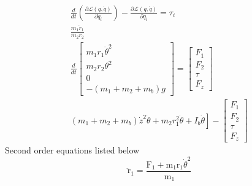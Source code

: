 \documentclass{UoNMCHA}
\numberwithin{equation}{section}
\begin{document}
$$
\begin{array}{c}
\frac{d}{d t}\left(\frac{\partial \mathcal{L}(q, \dot{q})}{\partial \dot{q}_{i}}\right)-\frac{\partial \mathcal{L}(q, \dot{q})}{\partial q_{i}}=\tau_{i} \\
\frac{m_{1} \dot{r}_{1}}{m_{2} \dot{r}_{2}} \\
\frac{d}{d t}\left[\begin{array}{c}
m_{1} r_{1} \dot{\theta}^{2} \\
m_{2} r_{2} \theta^{2} \\
0 \\
-\left(m_{1}+m_{2}+m_{b}\right) g
\end{array}\right]=\left[\begin{array}{c}
F_{1} \\
F_{2} \\
\tau \\
F_{z}
\end{array}\right] \\
\left.\left(m_{1}+m_{2}+m_{b}\right) \dot{z}^{2} \dot{\theta}+m_{2} r_{1}^{2} \dot{\theta}+I_{b} \dot{\theta}\right]-\left[\begin{array}{c}
F_{1} \\
F_{2} \\
\tau \\
F_{z}
\end{array}\right]
\end{array}
$$
Second order equations listed below
$$
\ddot{\mathrm{r}}_{1}=\frac{\mathrm{F}_{1}+\mathrm{m}_{1} \mathrm{r}_{1} \dot{\theta}^{2}}{\mathrm{~m}_{1}}
$$
\end{document}
